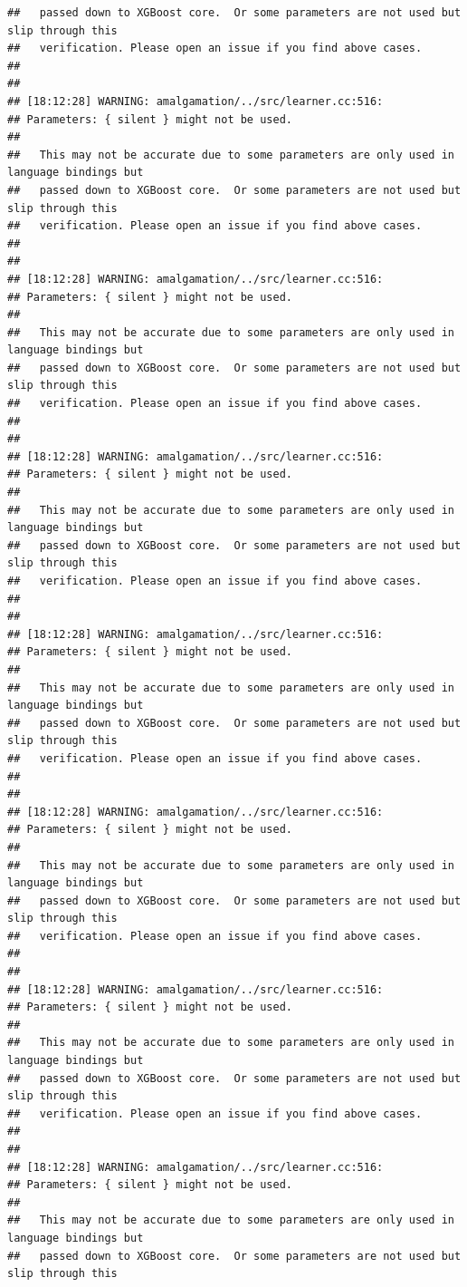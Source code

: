 \documentclass[AMS,STIX2COL]{WileyNJD-v2}\usepackage[]{graphicx}\usepackage[]{color}
\makeatletter
\newenvironment{kframe}{%
 \def\at@end@of@kframe{}%
 \ifinner\ifhmode%
  \def\at@end@of@kframe{\end{minipage}}%
  \begin{minipage}{\columnwidth}%
 \fi\fi%
 \def\FrameCommand##1{\hskip\@totalleftmargin \hskip-\fboxsep
 \colorbox{shadecolor}{##1}\hskip-\fboxsep
     \hskip-\linewidth \hskip-\@totalleftmargin \hskip\columnwidth}%
 \MakeFramed {\advance\hsize-\width
   \@totalleftmargin\z@ \linewidth\hsize
   \@setminipage}}%
 {\par\unskip\endMakeFramed%
 \at@end@of@kframe}
\newenvironment{knitrout}{}{} %
\makeatother
\begin{document}
\begin{knitrout}
\begin{kframe}
\begin{verbatim}
##   passed down to XGBoost core.  Or some parameters are not used but slip through this
##   verification. Please open an issue if you find above cases.
## 
## 
## [18:12:28] WARNING: amalgamation/../src/learner.cc:516: 
## Parameters: { silent } might not be used.
## 
##   This may not be accurate due to some parameters are only used in language bindings but
##   passed down to XGBoost core.  Or some parameters are not used but slip through this
##   verification. Please open an issue if you find above cases.
## 
## 
## [18:12:28] WARNING: amalgamation/../src/learner.cc:516: 
## Parameters: { silent } might not be used.
## 
##   This may not be accurate due to some parameters are only used in language bindings but
##   passed down to XGBoost core.  Or some parameters are not used but slip through this
##   verification. Please open an issue if you find above cases.
## 
## 
## [18:12:28] WARNING: amalgamation/../src/learner.cc:516: 
## Parameters: { silent } might not be used.
## 
##   This may not be accurate due to some parameters are only used in language bindings but
##   passed down to XGBoost core.  Or some parameters are not used but slip through this
##   verification. Please open an issue if you find above cases.
## 
## 
## [18:12:28] WARNING: amalgamation/../src/learner.cc:516: 
## Parameters: { silent } might not be used.
## 
##   This may not be accurate due to some parameters are only used in language bindings but
##   passed down to XGBoost core.  Or some parameters are not used but slip through this
##   verification. Please open an issue if you find above cases.
## 
## 
## [18:12:28] WARNING: amalgamation/../src/learner.cc:516: 
## Parameters: { silent } might not be used.
## 
##   This may not be accurate due to some parameters are only used in language bindings but
##   passed down to XGBoost core.  Or some parameters are not used but slip through this
##   verification. Please open an issue if you find above cases.
## 
## 
## [18:12:28] WARNING: amalgamation/../src/learner.cc:516: 
## Parameters: { silent } might not be used.
## 
##   This may not be accurate due to some parameters are only used in language bindings but
##   passed down to XGBoost core.  Or some parameters are not used but slip through this
##   verification. Please open an issue if you find above cases.
## 
## 
## [18:12:28] WARNING: amalgamation/../src/learner.cc:516: 
## Parameters: { silent } might not be used.
## 
##   This may not be accurate due to some parameters are only used in language bindings but
##   passed down to XGBoost core.  Or some parameters are not used but slip through this

\end{verbatim}
\end{kframe}
\end{knitrout}
\end{document}
